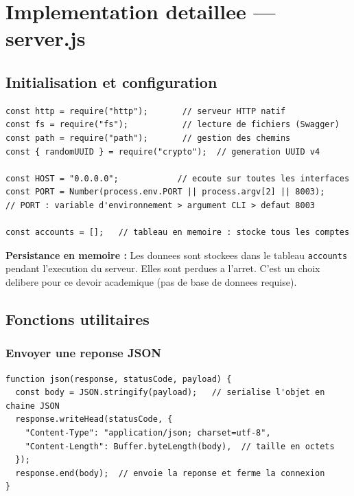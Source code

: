 \documentclass[12pt,a4paper]{article}
\begin{document}
\section{Implementation detaillee --- server.js}

\subsection{Initialisation et configuration}

\begin{lstlisting}[style=js, caption={server.js --- Imports et configuration}]
const http = require("http");       // serveur HTTP natif
const fs = require("fs");           // lecture de fichiers (Swagger)
const path = require("path");       // gestion des chemins
const { randomUUID } = require("crypto");  // generation UUID v4

const HOST = "0.0.0.0";            // ecoute sur toutes les interfaces
const PORT = Number(process.env.PORT || process.argv[2] || 8003);
// PORT : variable d'environnement > argument CLI > defaut 8003

const accounts = [];   // tableau en memoire : stocke tous les comptes
\end{lstlisting}

\begin{infobox}
\textbf{Persistance en memoire :} Les donnees sont stockees dans le tableau \texttt{accounts} pendant l'execution du serveur. Elles sont perdues a l'arret. C'est un choix delibere pour ce devoir academique (pas de base de donnees requise).
\end{infobox}

\subsection{Fonctions utilitaires}

\subsubsection{Envoyer une reponse JSON}

\begin{lstlisting}[style=js, caption={server.js --- Fonction json()}]
function json(response, statusCode, payload) {
  const body = JSON.stringify(payload);   // serialise l'objet en chaine JSON
  response.writeHead(statusCode, {
    "Content-Type": "application/json; charset=utf-8",
    "Content-Length": Buffer.byteLength(body),  // taille en octets
  });
  response.end(body);  // envoie la reponse et ferme la connexion
}
\end{lstlisting}
\end{document}
